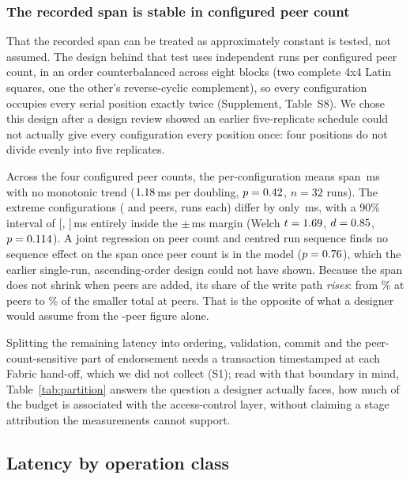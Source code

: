 \documentclass[a4paper,fleqn]{cas-sc}
\begin{document}


\subsubsection{The recorded span is stable in configured peer count}
\label{subsubsec:acinvariance}

That the recorded span can be treated as approximately constant is tested,
not assumed. The design behind that test uses \PartRunsPerConfig{}
independent runs per configured peer count, in an order counterbalanced
across eight blocks (two complete 4x4 Latin squares, one the other's
reverse-cyclic complement), so every configuration occupies every serial
position exactly twice (Supplement, Table~S8). We chose this design after a
design review showed an earlier five-replicate schedule could not actually
give every configuration every position once: four positions do not divide
evenly into five replicates.

Across the four configured peer counts, the per-configuration means span
\PartSpread\,ms with no monotonic trend ($1.18$\,ms per doubling,
$p=0.42$, $n=32$ runs). The extreme configurations
(\ScaleMinPeers{} and \ScaleMaxPeers{} peers, \PartRunsPerConfig{} runs
each) differ by only \PartTostDiff\,ms, with a 90\% interval of
[\PartTostLow, \PartTostHigh]\,ms entirely inside the
$\pm$\DecisionMargin\,ms margin (Welch $t=1.69$, $d=0.85$,
$p=0.114$). A joint regression on peer count and centred run
sequence finds no sequence effect on the span once peer count is in the
model ($p=0.76$), which the earlier single-run,
ascending-order design could not have shown. Because the span does not
shrink when peers are added, its share of the write path \emph{rises}: from
\PartAccessPct\% at \ScaleMinPeers{} peers to \PartAccessPctAtMax\% of the
smaller total at \ScaleMaxPeers{} peers. That is the opposite of what a
designer would assume from the \ScaleMinPeers-peer figure alone.

Splitting the remaining latency into ordering, validation, commit and the
peer-count-sensitive part of endorsement needs a transaction timestamped at
each Fabric hand-off, which we did not collect (S1); read with that
boundary in mind, Table~\ref{tab:partition} answers the question a designer
actually faces, how much of the budget is associated with the
access-control layer, without claiming a stage attribution the
measurements cannot support.

\subsection{Latency by operation class}
\label{subsec:byclass}
\end{document}
